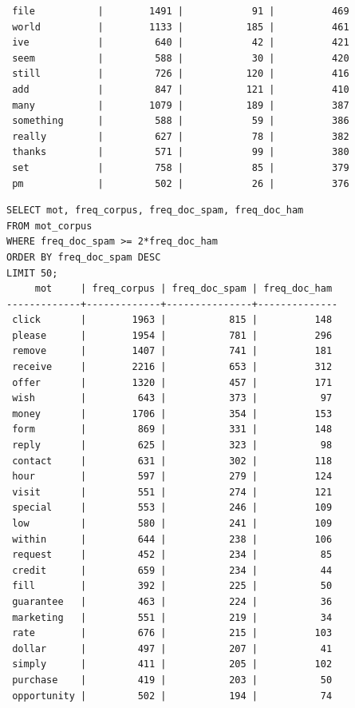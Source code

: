 \documentclass[a4paper,12pt]{article}
\begin{document}
\begin{verbatim}
 file           |        1491 |            91 |          469
 world          |        1133 |           185 |          461
 ive            |         640 |            42 |          421
 seem           |         588 |            30 |          420
 still          |         726 |           120 |          416
 add            |         847 |           121 |          410
 many           |        1079 |           189 |          387
 something      |         588 |            59 |          386
 really         |         627 |            78 |          382
 thanks         |         571 |            99 |          380
 set            |         758 |            85 |          379
 pm             |         502 |            26 |          376
	\end{verbatim}
	
	\begin{verbatim}
SELECT mot, freq_corpus, freq_doc_spam, freq_doc_ham
FROM mot_corpus
WHERE freq_doc_spam >= 2*freq_doc_ham 
ORDER BY freq_doc_spam DESC
LIMIT 50;
     mot     | freq_corpus | freq_doc_spam | freq_doc_ham 
-------------+-------------+---------------+--------------
 click       |        1963 |           815 |          148
 please      |        1954 |           781 |          296
 remove      |        1407 |           741 |          181
 receive     |        2216 |           653 |          312
 offer       |        1320 |           457 |          171
 wish        |         643 |           373 |           97
 money       |        1706 |           354 |          153
 form        |         869 |           331 |          148
 reply       |         625 |           323 |           98
 contact     |         631 |           302 |          118
 hour        |         597 |           279 |          124
 visit       |         551 |           274 |          121
 special     |         553 |           246 |          109
 low         |         580 |           241 |          109
 within      |         644 |           238 |          106
 request     |         452 |           234 |           85
 credit      |         659 |           234 |           44
 fill        |         392 |           225 |           50
 guarantee   |         463 |           224 |           36
 marketing   |         551 |           219 |           34
 rate        |         676 |           215 |          103
 dollar      |         497 |           207 |           41
 simply      |         411 |           205 |          102
 purchase    |         419 |           203 |           50
 opportunity |         502 |           194 |           74

\end{verbatim}
\end{document}
